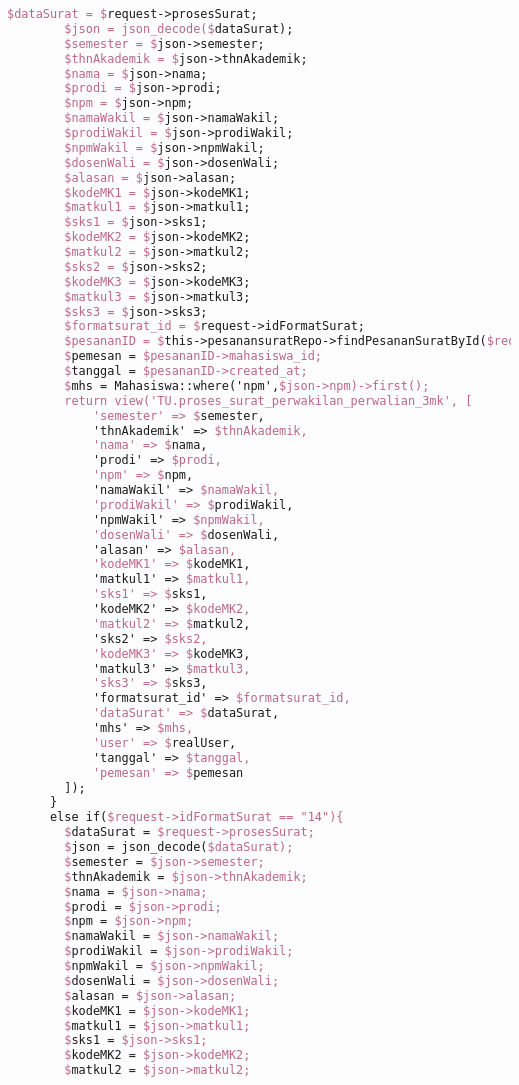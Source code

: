 \begin{lstlisting}[language=tex,basicstyle=\tiny,caption=PesanansuratController.php]
        $dataSurat = $request->prosesSurat;
        $json = json_decode($dataSurat);
        $semester = $json->semester;
        $thnAkademik = $json->thnAkademik;
        $nama = $json->nama;
        $prodi = $json->prodi;
        $npm = $json->npm;
        $namaWakil = $json->namaWakil;
        $prodiWakil = $json->prodiWakil;
        $npmWakil = $json->npmWakil;
        $dosenWali = $json->dosenWali;
        $alasan = $json->alasan;
        $kodeMK1 = $json->kodeMK1;
        $matkul1 = $json->matkul1;
        $sks1 = $json->sks1;
        $kodeMK2 = $json->kodeMK2;
        $matkul2 = $json->matkul2;
        $sks2 = $json->sks2;
        $kodeMK3 = $json->kodeMK3;
        $matkul3 = $json->matkul3;
        $sks3 = $json->sks3;
        $formatsurat_id = $request->idFormatSurat;
        $pesananID = $this->pesanansuratRepo->findPesananSuratById($request->id);
        $pemesan = $pesananID->mahasiswa_id;
        $tanggal = $pesananID->created_at;
        $mhs = Mahasiswa::where('npm',$json->npm)->first();
        return view('TU.proses_surat_perwakilan_perwalian_3mk', [
            'semester' => $semester,
            'thnAkademik' => $thnAkademik,
            'nama' => $nama,
            'prodi' => $prodi,
            'npm' => $npm,
            'namaWakil' => $namaWakil,
            'prodiWakil' => $prodiWakil,
            'npmWakil' => $npmWakil,
            'dosenWali' => $dosenWali,
            'alasan' => $alasan,
            'kodeMK1' => $kodeMK1,
            'matkul1' => $matkul1,
            'sks1' => $sks1,
            'kodeMK2' => $kodeMK2,
            'matkul2' => $matkul2,
            'sks2' => $sks2,
            'kodeMK3' => $kodeMK3,
            'matkul3' => $matkul3,
            'sks3' => $sks3,
            'formatsurat_id' => $formatsurat_id,
            'dataSurat' => $dataSurat,
            'mhs' => $mhs,
            'user' => $realUser,
            'tanggal' => $tanggal,
            'pemesan' => $pemesan
        ]);
      }
      else if($request->idFormatSurat == "14"){
        $dataSurat = $request->prosesSurat;
        $json = json_decode($dataSurat);
        $semester = $json->semester;
        $thnAkademik = $json->thnAkademik;
        $nama = $json->nama;
        $prodi = $json->prodi;
        $npm = $json->npm;
        $namaWakil = $json->namaWakil;
        $prodiWakil = $json->prodiWakil;
        $npmWakil = $json->npmWakil;
        $dosenWali = $json->dosenWali;
        $alasan = $json->alasan;
        $kodeMK1 = $json->kodeMK1;
        $matkul1 = $json->matkul1;
        $sks1 = $json->sks1;
        $kodeMK2 = $json->kodeMK2;
        $matkul2 = $json->matkul2;

\end{lstlisting}

